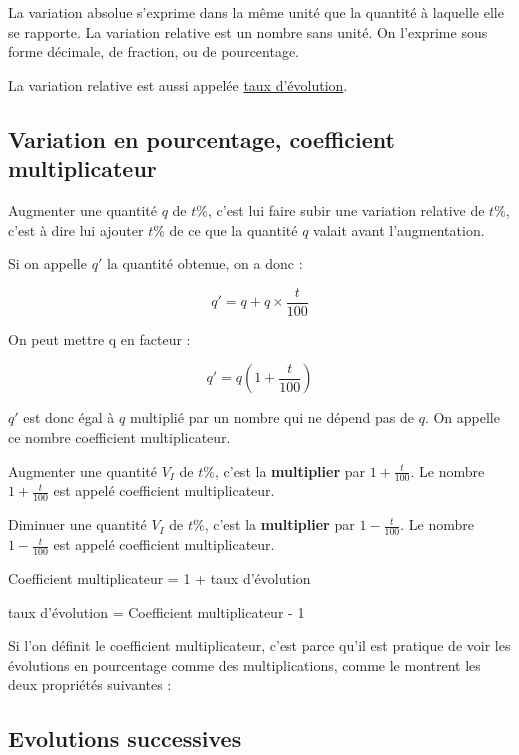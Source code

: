 \documentclass[10pt,a4paper,oneside]{book}
\begin{document}
La variation absolue s'exprime dans la même unité que la quantité à laquelle elle se rapporte.  La variation relative est un nombre sans unité. On l'exprime sous forme décimale, de fraction, ou de pourcentage.

La variation relative est aussi appelée \underline{taux d'évolution}.


\subsection{Variation en pourcentage, coefficient multiplicateur}


Augmenter une quantité $q$ de $t\%$, c'est lui faire subir une variation relative de $t\%$, c'est à dire lui ajouter $t\%$ de ce que la quantité $q$ valait avant l'augmentation. 

Si on appelle $q'$ la quantité obtenue, on a donc :

\[q' = q + q \times \frac{t}{100}\]

On peut mettre q en facteur :

\[q' = q(1 + \frac{t}{100})\]

$q'$ est donc égal à $q$ multiplié par un nombre qui ne dépend pas de $q$. On appelle ce nombre coefficient multiplicateur.


\begin{prop}
  Augmenter une quantité $V_I$ de $t\%$, c'est la \textbf{multiplier} par $1 + \frac{t}{100}$. Le nombre $1 + \frac{t}{100}$ est appelé coefficient multiplicateur.

  Diminuer une quantité $V_I$ de $t\%$, c'est la \textbf{multiplier} par $1 - \frac{t}{100}$. Le nombre $1 - \frac{t}{100}$ est appelé coefficient multiplicateur.
\end{prop}


\begin{prop}
  Coefficient multiplicateur = 1 + taux d'évolution

  taux d'évolution = Coefficient multiplicateur - 1
\end{prop}

Si l'on définit le coefficient multiplicateur, c'est parce qu'il est pratique de voir les évolutions en pourcentage comme des multiplications, comme le montrent les deux propriétés suivantes :

\subsection{Evolutions successives}
\end{document}
